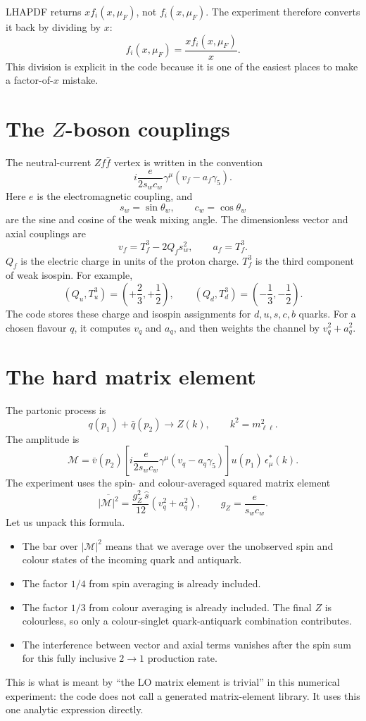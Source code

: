 \documentclass[11pt]{article}
\newcommand{\mll}{m_{\ell\ell}}
\newcommand{\shat}{\hat s}
\newcommand{\sw}{s_w}
\newcommand{\cw}{c_w}
\begin{document}
LHAPDF returns \(x f_i(x,\mu_F)\), not \(f_i(x,\mu_F)\).  The experiment
therefore converts it back by dividing by \(x\):
\[
  f_i(x,\mu_F) = \frac{x f_i(x,\mu_F)}{x}.
\]
This division is explicit in the code because it is one of the easiest places
to make a factor-of-\(x\) mistake.

\section{The \(Z\)-boson couplings}

The neutral-current \(Z f\bar f\) vertex is written in the convention
\[
  i\frac{e}{2\sw\cw}\gamma^\mu(v_f-a_f\gamma_5).
\]
Here \(e\) is the electromagnetic coupling, and
\[
  \sw = \sin\theta_w, \qquad \cw=\cos\theta_w
\]
are the sine and cosine of the weak mixing angle.  The dimensionless vector
and axial couplings are
\[
  v_f = T^3_f - 2 Q_f \sw^2,
  \qquad
  a_f = T^3_f .
\]
\(Q_f\) is the electric charge in units of the proton charge.  \(T^3_f\) is the
third component of weak isospin.  For example,
\[
  (Q_u,T^3_u)=\left(+\frac{2}{3},+\frac{1}{2}\right),
  \qquad
  (Q_d,T^3_d)=\left(-\frac{1}{3},-\frac{1}{2}\right).
\]
The code stores these charge and isospin assignments for \(d,u,s,c,b\) quarks.
For a chosen flavour \(q\), it computes \(v_q\) and \(a_q\), and then weights the
channel by \(v_q^2+a_q^2\).

\section{The hard matrix element}

The partonic process is
\[
  q(p_1) + \bar q(p_2) \to Z(k),
  \qquad k^2=\mll^2 .
\]
The amplitude is
\[
  \mathcal{M}
  =
  \bar v(p_2)
  \left[
    i\frac{e}{2\sw\cw}\gamma^\mu(v_q-a_q\gamma_5)
    \right]
  u(p_1)\,
  \epsilon_\mu^*(k).
\]
The experiment uses the spin- and colour-averaged squared matrix element
\[
  \overline{|\mathcal{M}|^2}
  =
  \frac{g_Z^2\,\shat}{12}\left(v_q^2+a_q^2\right),
  \qquad
  g_Z = \frac{e}{\sw\cw}.
\]
Let us unpack this formula.
\begin{itemize}
  \item The bar over \(|\mathcal{M}|^2\) means that we average over the
        unobserved spin and colour states of the incoming quark and antiquark.
  \item The factor \(1/4\) from spin averaging is already included.
  \item The factor \(1/3\) from colour averaging is already included.  The
        final \(Z\) is colourless, so only a colour-singlet quark-antiquark
        combination contributes.
  \item The interference between vector and axial terms vanishes after the
        spin sum for this fully inclusive \(2\to1\) production rate.
\end{itemize}
This is what is meant by ``the LO matrix element is trivial'' in this numerical
experiment: the code does not call a generated matrix-element library.  It uses
this one analytic expression directly.
\end{document}
